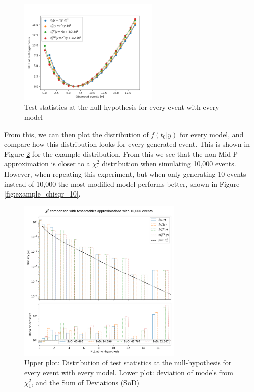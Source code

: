 \documentclass[14pt, a4paper]{article}  %
\begin{document}
\clearpage
\begin{figure}[!ht]
	\centering
        \includegraphics[width=0.6\textwidth]{OLD/image.png}\caption{Test statistics at the null-hypothesis for every event with every model}\label{fig:example_nll0}
\end{figure} 
From this, we can then plot the distribution of $f(t_0|y)$ for every model, and compare how this distribution looks for every generated event. This is shown in Figure \ref{fig:example_chisqr} for the example distribution. From this we see that the non Mid-P approximation is closer to a $\chi^2_1$ distribution when simulating 10,000 events. However, when repeating this experiment, but when only generating 10 events instead of 10,000 the most modified model performs better, shown in Figure \ref{fig:example_chisqr_10}.
\begin{figure}[!ht]
	\centering
        \includegraphics[width=0.7\textwidth]{Poisson_approximation_b2p997/NLL_densities.png}\caption{Upper plot: Distribution of test statistics at the null-hypothesis for every event with every model. Lower plot: deviation of models from $\chi^2_1$, and the Sum of Deviations (SoD) }\label{fig:example_chisqr}
\end{figure} 
\end{document}
